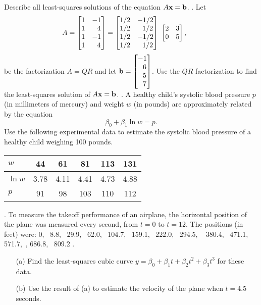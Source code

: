 \documentclass[12pt]{article}
\begin{document}
 Describe all 
least-squares solutions of the equation $A{\bf x} = {\bf b}$.
\vskip 10pt
. Let 
\[
A = \begin{bmatrix}1 & -1 \\1 & ~~4\\1 & -1\\1 & ~~4\end{bmatrix} = \begin{bmatrix} 1/2 & -1/2\\ 1/2 & ~~1/2 \\1/2 & - 1/2 \\1/2 & ~~1/2\end{bmatrix}~\begin{bmatrix}2 & 3\\0 & 5\end{bmatrix},\hskip 20pt
\]
be the factorization $A = QR$ and let ${\bf b} = \begin{bmatrix} -1\\~~6\\~~5\\~~7\end{bmatrix}$.
Use the $QR$ factorization to find the least-squares solution of $A{\bf x} = {\bf b}$.
\clearpage
{}. A healthy child's systolic blood pressure $p$ (in millimeters of mercury) and weight $w$ (in pounds) are approximately related by the equation
\[
\beta_0 + \beta_1\ln w = p.
\]
Use the following experimental data to estimate the systolic blood pressure of a healthy child weighing 100 pounds.
\begin{center}
\begin{tabular}{l | c c c c c}
$w$ & 44 & 61 & 81 & 113 & 131 \\
\hline
$\ln w$ & 3.78 & 4.11 & 4.41 & 4.73 & 4.88\\
\hline
$p$ & 91 & 98 & 103 & 110 & 112
\end{tabular}
\end{center}
\vskip 10pt
. To measure the takeoff performance of an airplane, the horizontal position of the plane was measured every second, from $t = 0$ to $t=12$. The positions (in feet) were: 0, ~8.8, ~29.9, ~62.0,~ 104.7,~ 159.1,~ 222.0, ~294.5, ~ 380.4,~ 471.1,~ 571.7,~, 686.8,~ 809.2 .
\begin{itemize}
\item[(a)] Find the least-squares cubic curve $y = \beta_0 + \beta_1 t + \beta_2 t^2 + \beta_3 t^3$ for these data.
\item[(b)] Use the result of (a) to estimate the velocity of the plane when $t = 4.5$ seconds.
\end{itemize}
\end{document}
